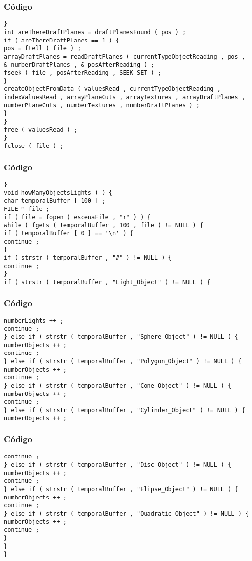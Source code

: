 \documentclass{beamer}
\begin{document}
\begin{frame}[fragile]
\frametitle{C\'odigo}
\begin{verbatim}
} 
int areThereDraftPlanes = draftPlanesFound ( pos ) ; 
if ( areThereDraftPlanes == 1 ) { 
pos = ftell ( file ) ; 
arrayDraftPlanes = readDraftPlanes ( currentTypeObjectReading , pos , & numberDraftPlanes , & posAfterReading ) ; 
fseek ( file , posAfterReading , SEEK_SET ) ; 
} 
createObjectFromData ( valuesRead , currentTypeObjectReading , indexValuesRead , arrayPlaneCuts , arrayTextures , arrayDraftPlanes , numberPlaneCuts , numberTextures , numberDraftPlanes ) ; 
} 
} 
free ( valuesRead ) ; 
} 
fclose ( file ) ; 
\end{verbatim}
\end{frame}
\begin{frame}[fragile]
\frametitle{C\'odigo}
\begin{verbatim}
} 
void howManyObjectsLights ( ) { 
char temporalBuffer [ 100 ] ; 
FILE * file ; 
if ( file = fopen ( escenaFile , "r" ) ) { 
while ( fgets ( temporalBuffer , 100 , file ) != NULL ) { 
if ( temporalBuffer [ 0 ] == '\n' ) { 
continue ; 
} 
if ( strstr ( temporalBuffer , "#" ) != NULL ) { 
continue ; 
} 
if ( strstr ( temporalBuffer , "Light_Object" ) != NULL ) { 
\end{verbatim}
\end{frame}
\begin{frame}[fragile]
\frametitle{C\'odigo}
\begin{verbatim}
numberLights ++ ; 
continue ; 
} else if ( strstr ( temporalBuffer , "Sphere_Object" ) != NULL ) { 
numberObjects ++ ; 
continue ; 
} else if ( strstr ( temporalBuffer , "Polygon_Object" ) != NULL ) { 
numberObjects ++ ; 
continue ; 
} else if ( strstr ( temporalBuffer , "Cone_Object" ) != NULL ) { 
numberObjects ++ ; 
continue ; 
} else if ( strstr ( temporalBuffer , "Cylinder_Object" ) != NULL ) { 
numberObjects ++ ; 
\end{verbatim}
\end{frame}
\begin{frame}[fragile]
\frametitle{C\'odigo}
\begin{verbatim}
continue ; 
} else if ( strstr ( temporalBuffer , "Disc_Object" ) != NULL ) { 
numberObjects ++ ; 
continue ; 
} else if ( strstr ( temporalBuffer , "Elipse_Object" ) != NULL ) { 
numberObjects ++ ; 
continue ; 
} else if ( strstr ( temporalBuffer , "Quadratic_Object" ) != NULL ) { 
numberObjects ++ ; 
continue ; 
} 
} 
} 
\end{verbatim}
\end{frame}
\end{document}
